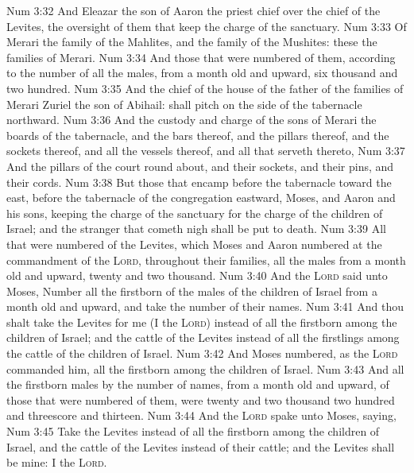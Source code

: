 \vs Num 3:32 And Eleazar the son of Aaron the priest  chief over the chief of the Levites,  the oversight of them that keep the charge of the sanctuary.
\vs Num 3:33 Of Merari  the family of the Mahlites, and the family of the Mushites: these  the families of Merari.
\vs Num 3:34 And those that were numbered of them, according to the number of all the males, from a month old and upward,  six thousand and two hundred.
\vs Num 3:35 And the chief of the house of the father of the families of Merari  Zuriel the son of Abihail:  shall pitch on the side of the tabernacle northward.
\vs Num 3:36 And  the custody and charge of the sons of Merari  the boards of the tabernacle, and the bars thereof, and the pillars thereof, and the sockets thereof, and all the vessels thereof, and all that serveth thereto,
\vs Num 3:37 And the pillars of the court round about, and their sockets, and their pins, and their cords.
\vs Num 3:38 But those that encamp before the tabernacle toward the east,  before the tabernacle of the congregation eastward,  Moses, and Aaron and his sons, keeping the charge of the sanctuary for the charge of the children of Israel; and the stranger that cometh nigh shall be put to death.
\vs Num 3:39 All that were numbered of the Levites, which Moses and Aaron numbered at the commandment of the \textsc{Lord}, throughout their families, all the males from a month old and upward,  twenty and two thousand.
\vs Num 3:40 And the \textsc{Lord} said unto Moses, Number all the firstborn of the males of the children of Israel from a month old and upward, and take the number of their names.
\vs Num 3:41 And thou shalt take the Levites for me (I  the \textsc{Lord}) instead of all the firstborn among the children of Israel; and the cattle of the Levites instead of all the firstlings among the cattle of the children of Israel.
\vs Num 3:42 And Moses numbered, as the \textsc{Lord} commanded him, all the firstborn among the children of Israel.
\vs Num 3:43 And all the firstborn males by the number of names, from a month old and upward, of those that were numbered of them, were twenty and two thousand two hundred and threescore and thirteen.
\vs Num 3:44 And the \textsc{Lord} spake unto Moses, saying,
\vs Num 3:45 Take the Levites instead of all the firstborn among the children of Israel, and the cattle of the Levites instead of their cattle; and the Levites shall be mine: I  the \textsc{Lord}.
